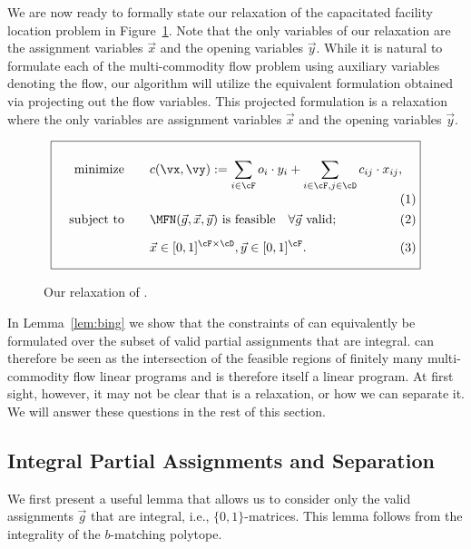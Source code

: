 We are now ready to formally state our relaxation \MFNLP of the  capacitated facility
location problem in Figure~\ref{fig:MFN-LP}. Note that the only variables of our relaxation are the assignment variables $\vec x$ and the opening variables $\vec y$. While it is natural to formulate each of the multi-commodity flow problem using auxiliary variables denoting the flow, our algorithm will utilize the equivalent formulation obtained via projecting out the flow variables. This projected formulation is a relaxation where the only variables are assignment variables $\vec x$ and the opening variables $\vec y$.
\begin{figure}[h!]
\begin{equation*}
\boxed{\begin{minipage}{10cm}\begin{align*}
            \textrm{minimize}\qquad & c(\vx,\vy):= \sum_{i\in \cF} o_i\cdot y_i  + \sum_{i\in \cF, j\in \cD} c_{ij} \cdot x_{ij},\\
            \textrm{subject to}\qquad & \MFN(\vec{g}, \vec{x}, \vec{y}) \mbox{ is feasible}\quad \forall \vec g\textrm{ valid};\\[2mm]
            &\vec{x}\in [0,1]^{\cF\times\cD},\vec{y}\in[0,1]^{\cF}.
          \end{align*}
          \vspace{-0.4cm}
        \end{minipage}}
\end{equation*}
\caption{Our relaxation of \cfl.}
\label{fig:MFN-LP}
\end{figure}

In Lemma~\ref{lem:bing} we show that the constraints of \MFNLP can equivalently be formulated over
the subset of valid partial assignments that are integral. \MFNLP can therefore be seen as the
intersection of the feasible regions
of finitely many multi-commodity flow linear programs and is therefore itself a linear program.
At first sight, however, it may not be clear that \MFNLP is a relaxation, or how we can separate it.
We will answer these questions in the rest of this section.

\subsection{Integral Partial Assignments and Separation}

We first present a useful lemma that allows us to consider only the valid assignments $\vec{g}$ that are integral, i.e., $\{0,1\}$-matrices. This lemma follows from the integrality of the $b$-matching polytope.


